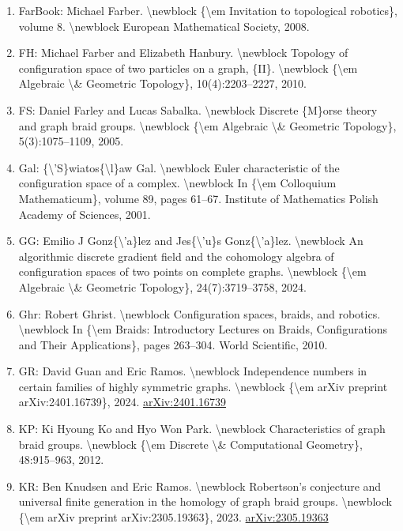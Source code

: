 \documentclass[11pt]{article}
\begin{document}
\begin{enumerate}[leftmargin=*]
  \item FarBook: Michael Farber. \textbackslash{}newblock \{\textbackslash{}em Invitation to topological robotics\}, volume 8. \textbackslash{}newblock European Mathematical Society, 2008.
  \item FH: Michael Farber and Elizabeth Hanbury. \textbackslash{}newblock Topology of configuration space of two particles on a graph, \{II\}. \textbackslash{}newblock \{\textbackslash{}em Algebraic \textbackslash{}\& Geometric Topology\}, 10(4):2203--2227, 2010.
  \item FS: Daniel Farley and Lucas Sabalka. \textbackslash{}newblock Discrete \{M\}orse theory and graph braid groups. \textbackslash{}newblock \{\textbackslash{}em Algebraic \textbackslash{}\& Geometric Topology\}, 5(3):1075--1109, 2005.
  \item Gal: \{\textbackslash{}'S\}wiatos\{\textbackslash{}l\}aw Gal. \textbackslash{}newblock Euler characteristic of the configuration space of a complex. \textbackslash{}newblock In \{\textbackslash{}em Colloquium Mathematicum\}, volume 89, pages 61--67. Institute of Mathematics Polish Academy of Sciences, 2001.
  \item GG: Emilio J Gonz\{\textbackslash{}'a\}lez and Jes\{\textbackslash{}'u\}s Gonz\{\textbackslash{}'a\}lez. \textbackslash{}newblock An algorithmic discrete gradient field and the cohomology algebra of configuration spaces of two points on complete graphs. \textbackslash{}newblock \{\textbackslash{}em Algebraic \textbackslash{}\& Geometric Topology\}, 24(7):3719--3758, 2024.
  \item Ghr: Robert Ghrist. \textbackslash{}newblock Configuration spaces, braids, and robotics. \textbackslash{}newblock In \{\textbackslash{}em Braids: Introductory Lectures on Braids, Configurations and Their Applications\}, pages 263--304. World Scientific, 2010.
  \item GR: David Guan and Eric Ramos. \textbackslash{}newblock Independence numbers in certain families of highly symmetric graphs. \textbackslash{}newblock \{\textbackslash{}em arXiv preprint arXiv:2401.16739\}, 2024. \href{https://arxiv.org/abs/2401.16739}{arXiv:2401.16739}
  \item KP: Ki Hyoung Ko and Hyo Won Park. \textbackslash{}newblock Characteristics of graph braid groups. \textbackslash{}newblock \{\textbackslash{}em Discrete \textbackslash{}\& Computational Geometry\}, 48:915--963, 2012.
  \item KR: Ben Knudsen and Eric Ramos. \textbackslash{}newblock Robertson's conjecture and universal finite generation in the homology of graph braid groups. \textbackslash{}newblock \{\textbackslash{}em arXiv preprint arXiv:2305.19363\}, 2023. \href{https://arxiv.org/abs/2305.19363}{arXiv:2305.19363}

\end{enumerate}
\end{document}
